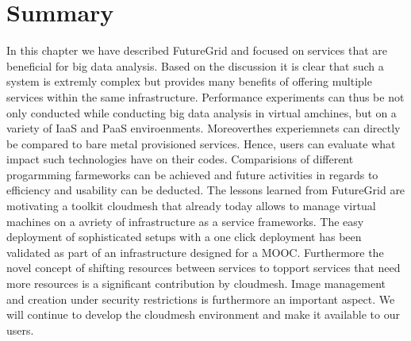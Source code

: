 \section{Summary}

In this chapter we have described FutureGrid and focused on services
that are beneficial for big data analysis. Based on the discussion it
is clear that such a system is extremly complex but provides many
benefits of offering multiple services within the same
infrastructure. Performance experiments can thus be not only conducted
while conducting big data analysis in virtual amchines, but on a
variety of IaaS and PaaS enviroenments. Moreoverthes experiemnets can
directly be compared to bare metal provisioned services. Hence, users
can evaluate what impact such technologies have on their
codes. Comparisions of different progarmming farmeworks can be
achieved and future activities in regards to efficiency and usability
can be deducted. The lessons learned from FutureGrid are motivating a
toolkit cloudmesh that already today allows to manage virtual machines
on a avriety of infrastructure as a service frameworks. The easy
deployment of sophisticated setups with a one click deployment has
been validated as part of an infrastructure designed for a
MOOC. Furthermore the novel concept of shifting resources
\cite{las08federated-cloud} between
services to topport services that need more resources is a significant
contribution by cloudmesh. Image management and creation under
security restrictions \cite{fg-1295}  is
furthermore an important aspect. We will continue to develop the
cloudmesh environment and make it available to our users. 